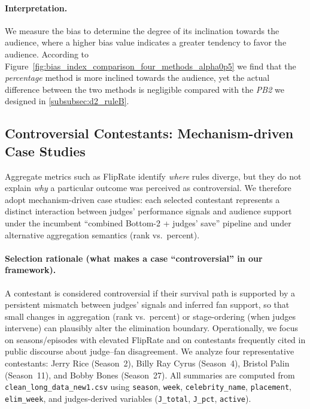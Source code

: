 \paragraph{Interpretation.}
We measure the bias to determine the degree of its inclination towards the audience, where a higher bias value indicates a greater tendency to favor the audience. 
According to Figure~\ref{fig:bias_index_comparison_four_methods_alpha0p5} we find that the \textit{percentage} method is more inclined towards the audience, yet the actual difference between the two methods is negligible compared with the \textit{PB2} we designed in \ref{subsubsec:d2_ruleB}.



\subsection{Controversial Contestants: Mechanism-driven Case Studies}\label{subsec:controversial_contestants_case_studies}

Aggregate metrics such as FlipRate identify \emph{where} rules diverge, but they do not explain \emph{why} a particular outcome
was perceived as controversial. We therefore adopt mechanism-driven case studies: each selected contestant represents a distinct
interaction between judges' performance signals and audience support under the incumbent ``combined Bottom-2 + judges' save'' pipeline
and under alternative aggregation semantics (rank vs.\ percent).

\paragraph{Selection rationale (what makes a case ``controversial'' in our framework).}
A contestant is considered controversial if their survival path is supported by a persistent mismatch between judges' signals and inferred fan support,
so that small changes in aggregation (rank vs.\ percent) or stage-ordering (when judges intervene) can plausibly alter the elimination boundary.
Operationally, we focus on seasons/episodes with elevated FlipRate and on contestants frequently cited in public discourse about judge--fan disagreement.
We analyze four representative contestants: Jerry Rice (Season~2), Billy Ray Cyrus (Season~4), Bristol Palin (Season~11), and Bobby Bones (Season~27).
All summaries are computed from \texttt{clean\_long\_data\_new1.csv} using \texttt{season}, \texttt{week}, \texttt{celebrity\_name}, \texttt{placement},
\texttt{elim\_week}, and judges-derived variables (\texttt{J\_total}, \texttt{J\_pct}, \texttt{active}).

